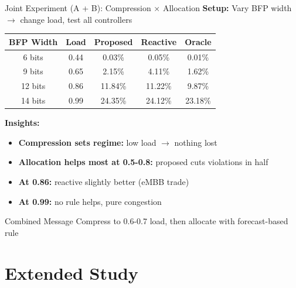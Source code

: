\documentclass[aspectratio=169]{beamer}
\begin{document}
\begin{frame}{Joint Experiment (A + B): Compression × Allocation}
\textbf{Setup:} Vary BFP width $\rightarrow$ change load, test all controllers

\begin{table}
\small
\begin{tabular}{ccccc}
\toprule
\textbf{BFP Width} & \textbf{Load} & \textbf{Proposed} & \textbf{Reactive} & \textbf{Oracle} \\
\midrule
6 bits & 0.44 & 0.03\% & 0.05\% & 0.01\% \\
9 bits & 0.65 & 2.15\% & 4.11\% & 1.62\% \\
12 bits & 0.86 & 11.84\% & 11.22\% & 9.87\% \\
14 bits & 0.99 & 24.35\% & 24.12\% & 23.18\% \\
\bottomrule
\end{tabular}
\end{table}

\textbf{Insights:}
\begin{itemize}
    \item \textbf{Compression sets regime:} low load $\rightarrow$ nothing lost
    \item \textbf{Allocation helps most at 0.5-0.8:} proposed cuts violations in half
    \item \textbf{At 0.86:} reactive slightly better (eMBB trade)
    \item \textbf{At 0.99:} no rule helps, pure congestion
\end{itemize}

\begin{block}{Combined Message}
Compress to 0.6-0.7 load, then allocate with forecast-based rule
\end{block}
\end{frame}

\section{Extended Study}
\end{document}

